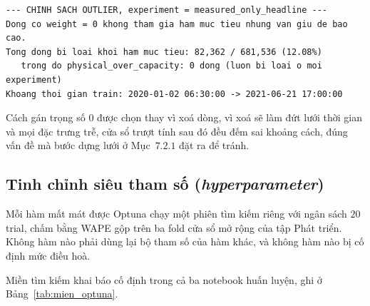 \documentclass[12pt, a4paper]{report}
\begin{document}
\begingroup
\par{}\vspace{8pt}
\footnotesize\renewcommand{\baselinestretch}{1.0}\selectfont
\begin{verbatim}
--- CHINH SACH OUTLIER, experiment = measured_only_headline ---
Dong co weight = 0 khong tham gia ham muc tieu nhung van giu de bao cao.
Tong dong bi loai khoi ham muc tieu: 82,362 / 681,536 (12.08%)
   trong do physical_over_capacity: 0 dong (luon bi loai o moi experiment)
Khoang thoi gian train: 2020-01-02 06:30:00 -> 2021-06-21 17:00:00
\end{verbatim}
\par\vspace{8pt}
\endgroup
Cách gán trọng số $0$ được chọn thay vì xoá dòng, vì xoá sẽ làm đứt lưới thời gian và mọi đặc
trưng trễ, cửa sổ trượt tính sau đó đều đếm sai khoảng cách, đúng vấn đề mà bước dựng lưới ở
Mục~$7.2.1$ đặt ra để tránh.

\FloatBarrier
\subsection{Tinh chỉnh siêu tham số (\textit{hyperparameter})}

Mỗi hàm mất mát được Optuna chạy một phiên tìm kiếm riêng với ngân sách $20$ trial,
chấm bằng WAPE gộp trên ba fold cửa sổ mở rộng của tập Phát triển. Không hàm nào phải dùng lại
bộ tham số của hàm khác, và không hàm nào bị cố định mức điều hoà.

Miền tìm kiếm khai báo cố định trong cả ba notebook huấn luyện, ghi ở
Bảng~\ref{tab:mien_optuna}.
\end{document}
